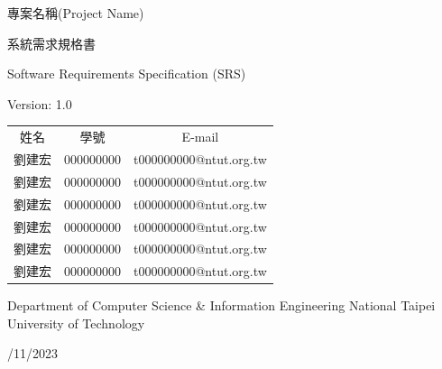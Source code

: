 \documentclass[a4paper, 12pt]{article}
\def\myProjectName{專案名稱(Project Name)}
\def\myVersion{1.0}
\newcommand\TwentyTitle{\fontsize{20pt}{24pt}\selectfont}
\newcommand\EighteenTitle{\fontsize{18pt}{20pt}\selectfont}
\newcommand\SixteenTitle{\fontsize{16pt}{18pt}\selectfont}
\begin{document}
\thispagestyle{empty}
\begin{center}
    {\TwentyTitle \myProjectName \par}
    \vspace{6cm}
    {\TwentyTitle 系統需求規格書 \par}
    {\EighteenTitle Software Requirements Specification (SRS) \par}
    {\SixteenTitle Version: \myVersion \par}
    \vspace{4cm}
    {\SixteenTitle
    \begin{tabular}{ccc}
      姓名 & 學號 & E-mail \\[0.2em]
      劉建宏 & 000000000 & t000000000@ntut.org.tw \\
      劉建宏 & 000000000 & t000000000@ntut.org.tw \\
      劉建宏 & 000000000 & t000000000@ntut.org.tw \\
      劉建宏 & 000000000 & t000000000@ntut.org.tw \\
      劉建宏 & 000000000 & t000000000@ntut.org.tw \\
      劉建宏 & 000000000 & t000000000@ntut.org.tw \\
    \end{tabular}
    \par}
    \vspace{2cm}
    {\SixteenTitle Department of Computer Science \& Information Engineering National Taipei University of Technology \par}
    \vspace{16pt}
    {\SixteenTitle 10/11/2023 \par}
\end{center}
\clearpage

\renewcommand{\contentsname}{目錄 (Table of Contents)}
\tableofcontents
\newpage



\end{document}

